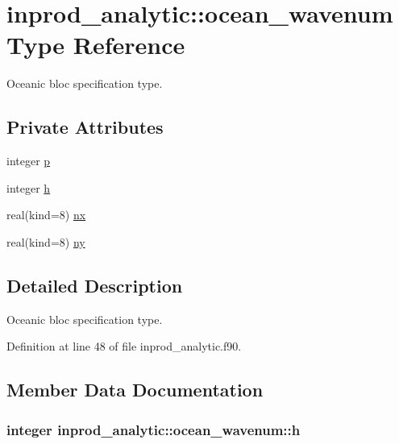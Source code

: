 \hypertarget{structinprod__analytic_1_1ocean__wavenum}{}\section{inprod\+\_\+analytic\+:\+:ocean\+\_\+wavenum Type Reference}
\label{structinprod__analytic_1_1ocean__wavenum}


Oceanic bloc specification type.  


\subsection*{Private Attributes}
\begin{DoxyCompactItemize}
\item 
integer \hyperlink{structinprod__analytic_1_1ocean__wavenum_a3170ff1b2a81b58ae81527a964682c06}{p}
\item 
integer \hyperlink{structinprod__analytic_1_1ocean__wavenum_a0669827dd9b250ef505da012599c40ff}{h}
\item 
real(kind=8) \hyperlink{structinprod__analytic_1_1ocean__wavenum_a6084ea7c554f942e74779a2be38b7d3d}{nx}
\item 
real(kind=8) \hyperlink{structinprod__analytic_1_1ocean__wavenum_a0738c305f503d7864a9073c5cea352ab}{ny}
\end{DoxyCompactItemize}


\subsection{Detailed Description}
Oceanic bloc specification type. 

Definition at line 48 of file inprod\+\_\+analytic.\+f90.



\subsection{Member Data Documentation}
\subsubsection[{\texorpdfstring{h}{h}}]{\setlength{\rightskip}{0pt plus 5cm}integer inprod\+\_\+analytic\+::ocean\+\_\+wavenum\+::h\hspace{0.3cm}{\ttfamily [private]}}\hypertarget{structinprod__analytic_1_1ocean__wavenum_a0669827dd9b250ef505da012599c40ff}{}\label{structinprod__analytic_1_1ocean__wavenum_a0669827dd9b250ef505da012599c40ff}


